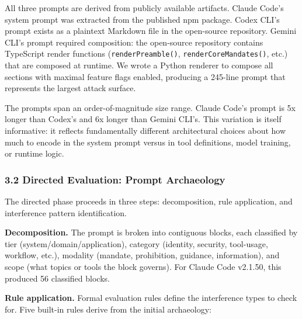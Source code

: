 \documentclass[
]{article}
\begin{document}
All three prompts are derived from publicly available artifacts. Claude
Code's system prompt was extracted from the published npm package. Codex
CLI's prompt exists as a plaintext Markdown file in the open-source
repository. Gemini CLI's prompt required composition: the open-source
repository contains TypeScript render functions
(\texttt{renderPreamble()}, \texttt{renderCoreMandates()}, etc.) that
are composed at runtime. We wrote a Python renderer to compose all
sections with maximal feature flags enabled, producing a 245-line prompt
that represents the largest attack surface.

The prompts span an order-of-magnitude size range. Claude Code's prompt
is 5x longer than Codex's and 6x longer than Gemini CLI's. This
variation is itself informative: it reflects fundamentally different
architectural choices about how much to encode in the system prompt
versus in tool definitions, model training, or runtime logic.

\hypertarget{directed-evaluation-prompt-archaeology}{%
\subsubsection{3.2 Directed Evaluation: Prompt
Archaeology}\label{directed-evaluation-prompt-archaeology}}

The directed phase proceeds in three steps: decomposition, rule
application, and interference pattern identification.

\textbf{Decomposition.} The prompt is broken into contiguous blocks,
each classified by tier (system/domain/application), category (identity,
security, tool-usage, workflow, etc.), modality (mandate, prohibition,
guidance, information), and scope (what topics or tools the block
governs). For Claude Code v2.1.50, this produced 56 classified blocks.

\textbf{Rule application.} Formal evaluation rules define the
interference types to check for. Five built-in rules derive from the
initial archaeology:
\end{document}
